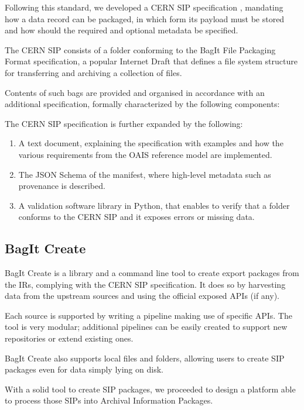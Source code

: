 \documentclass[11pt]{IEEEtran}
\begin{document}
Following this standard, we developed a CERN SIP specification \cite{CERNDigitalMemorySIPSpecGitLab-2021-09-15}, mandating how a data record can be packaged, in which form its payload must be stored and how should the required and optional metadata be specified.

The CERN SIP consists of a folder conforming to the BagIt File Packaging Format specification, a popular Internet Draft that defines a file system structure for transferring and archiving a collection of files.

Contents of such bags are provided and organised in accordance with an additional specification, formally characterized by the following components:

The CERN SIP specification is further expanded by the following:

\begin{enumerate}
    \item A text document, explaining the specification with examples and how the various requirements from the OAIS reference model are implemented.
    \item The JSON Schema of the manifest, where high-level metadata such as provenance is described.
    \item A validation software library in Python, that enables to verify that a folder conforms to the CERN SIP and it exposes errors or missing data.
\end{enumerate}

\subsection{BagIt Create}

BagIt Create is a library and a command line tool to create export packages from the IRs, complying with the CERN SIP specification. It does so by harvesting data from the upstream sources and using the official exposed APIs (if any).

Each source is supported by writing a pipeline making use of specific APIs. The tool is very modular; additional pipelines can be easily created to support new repositories or extend existing ones.

BagIt Create also supports local files and folders, allowing users to create SIP packages even for data simply lying on disk.

With a solid tool to create SIP packages, we proceeded to design a platform able to process those SIPs into Archival Information Packages.
\end{document}
